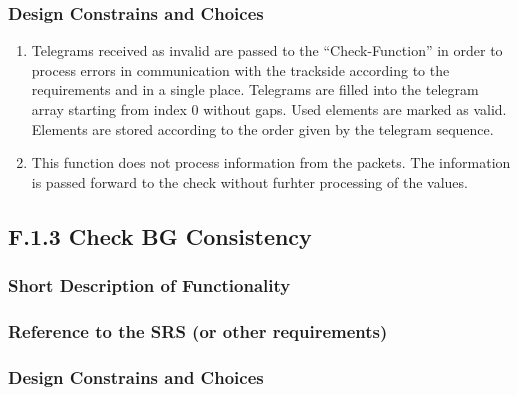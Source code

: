 \documentclass{template/openetcs_report}
\begin{document}
\subsubsection{Design Constrains and Choices}
\begin{enumerate}
\item Telegrams received as invalid are passed to the ``Check-Function'' in order to process errors in communication with the trackside according to the requirements and in a single place.
Telegrams are filled into the telegram array starting from index 0 without gaps. Used elements are marked as valid. Elements are stored according to the order given by the telegram sequence.
\item This function does not process information from the packets. The information is passed forward to the check without furhter processing of the values. 
\end{enumerate}



\subsection{F.1.3 Check BG Consistency}

\subsubsection{Short Description of Functionality}
\subsubsection{Reference to the SRS (or other requirements)}
\subsubsection{Design Constrains and Choices}

\end{document}
